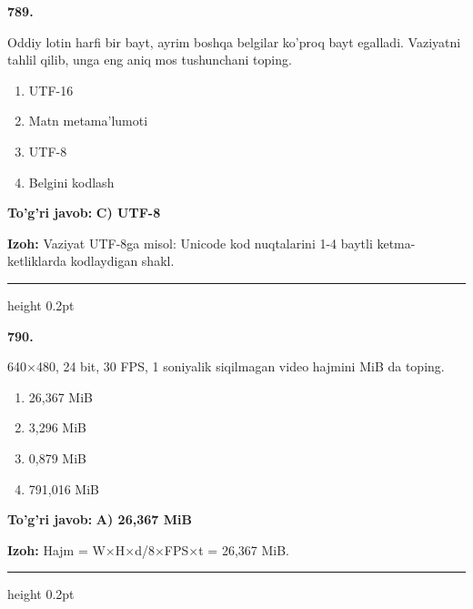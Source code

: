 \documentclass[10pt,a4paper,oneside]{article}
\begin{document}
\noindent\textbf{\color{ink}789.}
\par
Oddiy lotin harfi bir bayt, ayrim boshqa belgilar ko'proq bayt egalladi. Vaziyatni tahlil qilib, unga eng aniq mos tushunchani toping.
\begin{enumerate}[label=\Alph*),leftmargin=9mm]
\item UTF-16
\item Matn metama'lumoti
\item UTF-8
\item Belgini kodlash
\end{enumerate}
\begin{tcolorbox}[enhanced,breakable,colback=teal!4,colframe=teal!50!black,boxrule=0.5pt,arc=1.1mm,left=3mm,right=3mm,top=1.7mm,bottom=1.7mm,before skip=2mm,after skip=2mm]
\textbf{\color{teal}To'g'ri javob:} \textbf{C) UTF-8}
\par\smallskip
\textbf{Izoh:} Vaziyat UTF-8ga misol: Unicode kod nuqtalarini 1-4 baytli ketma-ketliklarda kodlaydigan shakl.
\end{tcolorbox}
\vspace{2mm}\hrule height 0.2pt \vspace{3mm}

\noindent\textbf{\color{ink}790.}
\par
640\ensuremath{\times}480, 24 bit, 30 FPS, 1 soniyalik siqilmagan video hajmini MiB da toping.
\begin{enumerate}[label=\Alph*),leftmargin=9mm]
\item 26,367 MiB
\item 3,296 MiB
\item 0,879 MiB
\item 791,016 MiB
\end{enumerate}
\begin{tcolorbox}[enhanced,breakable,colback=teal!4,colframe=teal!50!black,boxrule=0.5pt,arc=1.1mm,left=3mm,right=3mm,top=1.7mm,bottom=1.7mm,before skip=2mm,after skip=2mm]
\textbf{\color{teal}To'g'ri javob:} \textbf{A) 26,367 MiB}
\par\smallskip
\textbf{Izoh:} Hajm = W\ensuremath{\times}H\ensuremath{\times}d/8\ensuremath{\times}FPS\ensuremath{\times}t = 26,367 MiB.
\end{tcolorbox}
\vspace{2mm}\hrule height 0.2pt \vspace{3mm}
\end{document}
